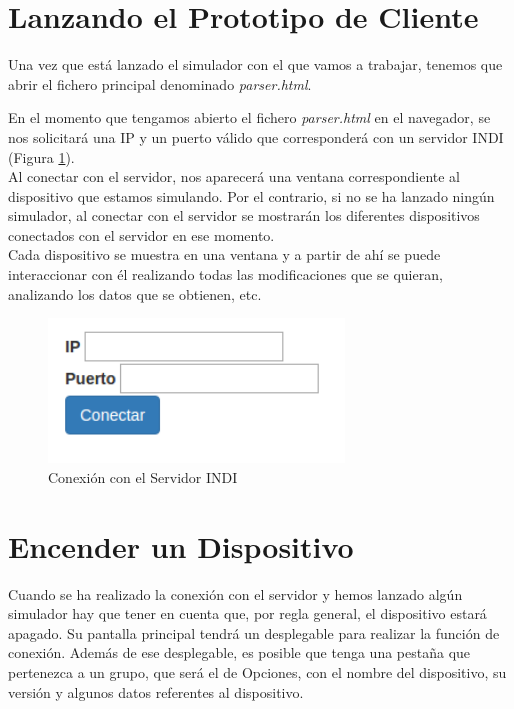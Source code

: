 \section{Lanzando el Prototipo de Cliente}
Una vez que está lanzado el simulador con el que vamos a trabajar, tenemos que abrir el fichero principal denominado \textit{parser.html}.

En el momento que tengamos abierto el fichero \textit{parser.html} en el navegador, se nos solicitará una IP y un puerto válido que corresponderá con un servidor INDI (Figura \ref{fig:conexionINDI}).\\

Al conectar con el servidor, nos aparecerá una ventana correspondiente al dispositivo que estamos simulando. Por el contrario, si no se ha lanzado ningún simulador, al conectar con el servidor se mostrarán los diferentes dispositivos conectados con el servidor en ese momento. \\

Cada dispositivo se muestra en una ventana y a partir de ahí se puede interaccionar con él realizando todas las modificaciones que se quieran, analizando los datos que se obtienen, etc.
\begin{figure}[htb]
\centering
\includegraphics[width=0.7\textwidth]{./imagenes/capturaConexion}
\caption{Conexión con el Servidor INDI} \label{fig:conexionINDI}
\end{figure}

\section{Encender un Dispositivo}
Cuando se ha realizado la conexión con el servidor y hemos lanzado algún simulador hay que tener en cuenta que, por regla general, el dispositivo estará apagado. Su pantalla principal tendrá un desplegable para realizar la función de conexión. Además de ese desplegable, es posible que tenga una pestaña que pertenezca a un grupo, que será el de Opciones, con el nombre del dispositivo, su versión y algunos datos referentes al dispositivo. \\

